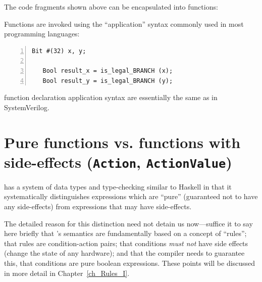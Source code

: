 \label{BSV_functions_2}

The code fragments shown above can be encapsulated into {\BSV}
functions:



Functions are invoked using the ``application'' syntax commonly used
in most programming languages:

{\footnotesize
\begin{Verbatim}[frame=single, numbers=left]
   Bit #(32) x, y;

   Bool result_x = is_legal_BRANCH (x);
   Bool result_y = is_legal_BRANCH (y);
\end{Verbatim}
}

{\BSV} function declaration application syntax are essentially the
same as in SystemVerilog.





\section{Pure functions vs. functions with side-effects ({\tt Action}, {\tt ActionValue})}

\label{Sec_Pure_vs_Side_Effect_functions}


{\BSV} has a system of data types and type-checking similar to Haskell in
that it systematically distinguishes expressions which are ``pure''
(guaranteed not to have any side-effects) from expressions that may
have side-effects.

The detailed reason for this distinction need not detain us
now---suffice it to say here briefly that {\BSV}'s semantics are
fundamentally based on a concept of ``rules''; that rules are
condition-action pairs; that conditions \emph{must not} have side
effects (change the state of any hardware); and that the compiler
needs to guarantee this, {\ie} that conditions are pure boolean
expressions.  These points will be discussed in more detail in
Chapter~\ref{ch_Rules_I}.

